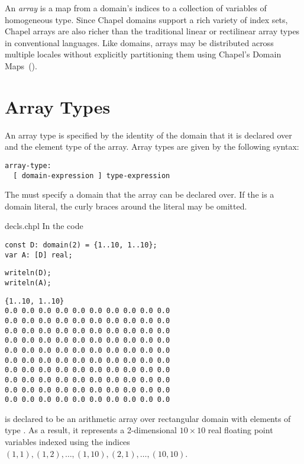 \label{Arrays}

An \emph{array} is a map from a domain's indices to a collection of
variables of homogeneous type.  Since Chapel domains support a rich
variety of index sets, Chapel arrays are also richer than the
traditional linear or rectilinear array types in conventional
languages.  Like domains, arrays may be distributed across multiple
locales without explicitly partitioning them using Chapel's Domain
Maps~().


\section{Array Types}
\label{Array_Types}

An array type is specified by the identity of the domain that it is
declared over and the element type of the array.  Array types are
given by the following syntax:

\begin{syntax}
\begin{verbatim}
array-type:
  [ domain-expression ] type-expression
\end{verbatim}
\end{syntax}
The  must specify a domain that the array can
be declared over.  If the  is a domain
literal, the curly braces around the literal may be omitted.

\begin{chapelexample}{decls.chpl}
In the code
\begin{chapel}
\begin{verbatim}
const D: domain(2) = {1..10, 1..10};
var A: [D] real;
\end{verbatim}
\end{chapel}
\begin{chapelpost}
\begin{verbatim}
writeln(D);
writeln(A);
\end{verbatim}
\end{chapelpost}
\begin{chapeloutput}
\begin{verbatim}
{1..10, 1..10}
0.0 0.0 0.0 0.0 0.0 0.0 0.0 0.0 0.0 0.0
0.0 0.0 0.0 0.0 0.0 0.0 0.0 0.0 0.0 0.0
0.0 0.0 0.0 0.0 0.0 0.0 0.0 0.0 0.0 0.0
0.0 0.0 0.0 0.0 0.0 0.0 0.0 0.0 0.0 0.0
0.0 0.0 0.0 0.0 0.0 0.0 0.0 0.0 0.0 0.0
0.0 0.0 0.0 0.0 0.0 0.0 0.0 0.0 0.0 0.0
0.0 0.0 0.0 0.0 0.0 0.0 0.0 0.0 0.0 0.0
0.0 0.0 0.0 0.0 0.0 0.0 0.0 0.0 0.0 0.0
0.0 0.0 0.0 0.0 0.0 0.0 0.0 0.0 0.0 0.0
0.0 0.0 0.0 0.0 0.0 0.0 0.0 0.0 0.0 0.0
\end{verbatim}
\end{chapeloutput}
 is declared to be an arithmetic array over rectangular
domain  with elements of type .  As a result, it
represents a 2-dimensional $10 \times 10$ real floating point
variables indexed using the indices
$(1, 1), (1, 2), \ldots, (1, 10), (2, 1), \ldots, (10, 10)$.
\end{chapelexample}

